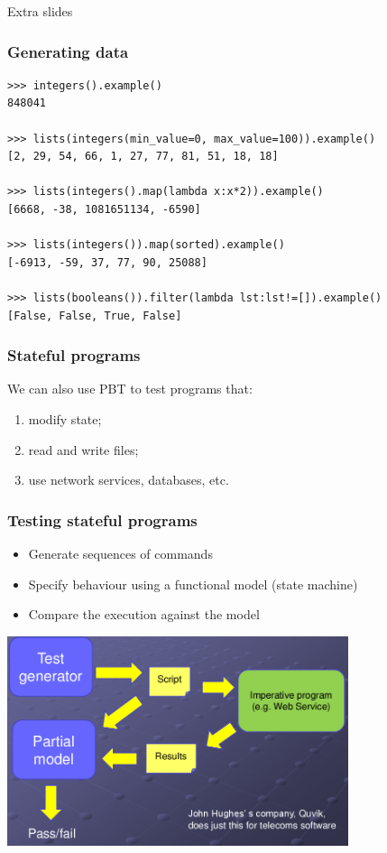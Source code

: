 \documentclass{beamer}
\begin{document}
\begin{frame}
\begin{center}
  \Huge Extra slides
\end{center} 
\end{frame}



\begin{frame}[fragile]
  \frametitle{Generating data}

\begin{verbatim}
>>> integers().example()
848041

>>> lists(integers(min_value=0, max_value=100)).example()
[2, 29, 54, 66, 1, 27, 77, 81, 51, 18, 18]

>>> lists(integers().map(lambda x:x*2)).example()
[6668, -38, 1081651134, -6590]

>>> lists(integers()).map(sorted).example()
[-6913, -59, 37, 77, 90, 25088]

>>> lists(booleans()).filter(lambda lst:lst!=[]).example()
[False, False, True, False]
\end{verbatim}
  
\end{frame}


\begin{frame}
  \frametitle{Stateful programs}

We can also use PBT to test programs that:
\begin{enumerate}
\item modify state;
\item read and write files;
\item use network services, databases, etc.
\end{enumerate}
\end{frame}

\begin{frame}
  \frametitle{Testing stateful programs}

\begin{itemize}
\item Generate sequences of commands
\item Specify behaviour using a functional model (state machine)
\item Compare the execution against the model
\end{itemize}

\begin{center}
\includegraphics[width=0.75\textwidth]{images/imperative.png}
\end{center}
\end{frame}
\end{document}
